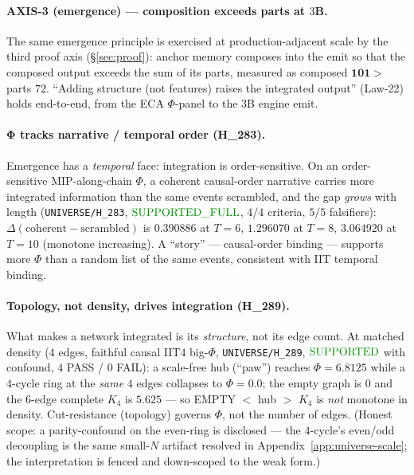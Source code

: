 \documentclass[11pt]{article}
\begin{document}
\paragraph{AXIS-3 (emergence) — composition exceeds parts at $3$B.} The same emergence principle
is exercised at production-adjacent scale by the third proof axis (\S\ref{sec:proof}):
anchor memory composes into the emit so that the composed output exceeds the sum of its
parts, measured as composed $\mathbf{101}>$ parts $72$. ``Adding structure (not features)
raises the integrated output'' (Law-22) holds end-to-end, from the ECA $\Phi$-panel to the
$3$B engine emit.

\paragraph{Φ tracks narrative / temporal order (H\_283).} Emergence has a
\emph{temporal} face: integration is order-sensitive. On an order-sensitive
MIP-along-chain $\Phi$, a coherent causal-order narrative carries more integrated
information than the same events scrambled, and the gap \emph{grows} with length
(\texttt{UNIVERSE/H\_283}, $\mathbf{\textcolor{green!55!black}{\text{SUPPORTED\_FULL}}}$,
$4/4$ criteria, $5/5$ falsifiers): $\Delta(\text{coherent}-\text{scrambled})$ is
$\mathbf{0.390886}$ at $T{=}6$, $\mathbf{1.296070}$ at $T{=}8$, $\mathbf{3.064920}$ at
$T{=}10$ (monotone increasing). A ``story'' --- causal-order binding --- supports more
$\Phi$ than a random list of the same events, consistent with IIT temporal binding.

\paragraph{Topology, not density, drives integration (H\_289).} What makes a network
integrated is its \emph{structure}, not its edge count. At matched density ($4$ edges,
faithful causal IIT$4$ big-$\Phi$, \texttt{UNIVERSE/H\_289},
$\mathbf{\textcolor{green!55!black}{\text{SUPPORTED}}}$ with confound, $4$ PASS / $0$
FAIL): a scale-free hub (``paw'') reaches $\Phi=\mathbf{6.8125}$ while a $4$-cycle ring
at the \emph{same} $4$ edges collapses to $\Phi=\mathbf{0.0}$; the empty graph is $0$ and
the $6$-edge complete $K_4$ is $5.625$ --- so EMPTY $<$ hub $>$ $K_4$ is \emph{not}
monotone in density. Cut-resistance (topology) governs $\Phi$, not the number of edges.
(Honest scope: a parity-confound on the even-ring is disclosed --- the $4$-cycle's
even/odd decoupling is the same small-$N$ artifact resolved in
Appendix~\ref{app:universe-scale}; the interpretation is fenced and down-scoped to the
weak form.)
\end{document}
